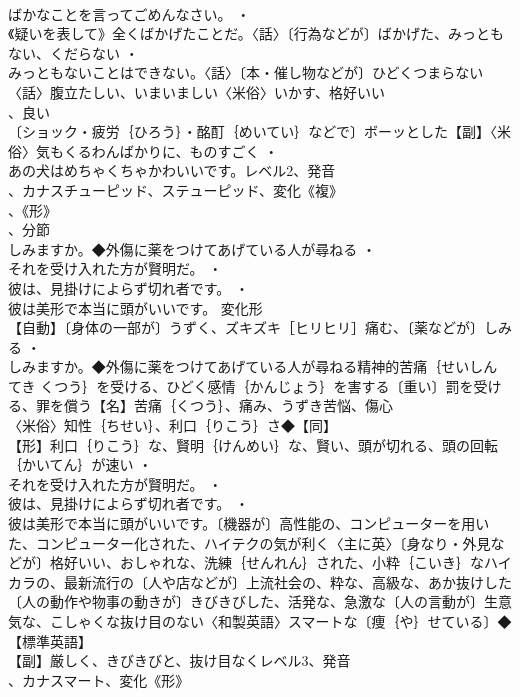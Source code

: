 \documentclass[8pt]{extreport}
\begin{document}
\begin{CJK}{UTF8}{min}
\\	ばかなことを言ってごめんなさい。 ・
\\	《疑いを表して》全くばかげたことだ。〈話〉〔行為などが〕ばかげた、みっともない、くだらない ・
\\	みっともないことはできない。〈話〉〔本・催し物などが〕ひどくつまらない〈話〉腹立たしい、いまいましい〈米俗〉いかす、格好いい
\\	、良い
\\	〔ショック・疲労｛ひろう｝・酩酊｛めいてい｝などで〕ボーッとした【副】〈米俗〉気もくるわんばかりに、ものすごく ・
\\	あの犬はめちゃくちゃかわいいです。レベル2、発音
\\	、カナスチューピッド、ステューピッド、変化《複》
\\	、《形》
\\	、分節
\\	しみますか。◆外傷に薬をつけてあげている人が尋ねる ・
\\	それを受け入れた方が賢明だ。 ・
\\	彼は、見掛けによらず切れ者です。 ・
\\	彼は美形で本当に頭がいいです。	変化形 
\\	【自動】〔身体の一部が〕うずく、ズキズキ［ヒリヒリ］痛む、〔薬などが〕しみる ・
\\	しみますか。◆外傷に薬をつけてあげている人が尋ねる精神的苦痛｛せいしん てき くつう｝を受ける、ひどく感情｛かんじょう｝を害する〔重い〕罰を受ける、罪を償う【名】苦痛｛くつう｝、痛み、うずき苦悩、傷心
\\	〈米俗〉知性｛ちせい｝、利口｛りこう｝さ◆【同】
\\	【形】利口｛りこう｝な、賢明｛けんめい｝な、賢い、頭が切れる、頭の回転｛かいてん｝が速い ・
\\	それを受け入れた方が賢明だ。 ・
\\	彼は、見掛けによらず切れ者です。 ・
\\	彼は美形で本当に頭がいいです。〔機器が〕高性能の、コンピューターを用いた、コンピューター化された、ハイテクの気が利く〈主に英〉〔身なり・外見などが〕格好いい、おしゃれな、洗練｛せんれん｝された、小粋｛こいき｝なハイカラの、最新流行の〔人や店などが〕上流社会の、粋な、高級な、あか抜けした〔人の動作や物事の動きが〕きびきびした、活発な、急激な〔人の言動が〕生意気な、こしゃくな抜け目のない〈和製英語〉スマートな〔痩｛や｝せている〕◆【標準英語】
\\	【副】厳しく、きびきびと、抜け目なくレベル3、発音
\\	、カナスマート、変化《形》

\end{CJK}
\end{document}
